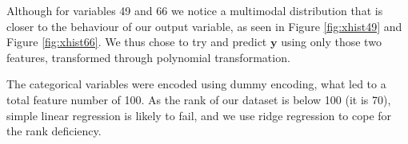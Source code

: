\documentclass{article} %
\begin{document}
Although for variables 49 and 66 we notice a multimodal distribution that is
closer to the behaviour of our output variable, as seen in Figure
\ref{fig:xhist49} and Figure \ref{fig:xhist66}. We thus chose to try and predict
$\mathbf{y}$ using only those two features, transformed through polynomial
transformation.

The categorical variables were encoded using dummy encoding, what led to a total
feature number of 100. As the rank of our dataset is below 100 (it is 70),
simple linear regression is likely to fail, and we use ridge regression to cope
for the rank deficiency.

\begin{figure}[!t]
\center
{}
\hfill
{}
\hspace*{0.3in}
\end{figure}
\end{document}

